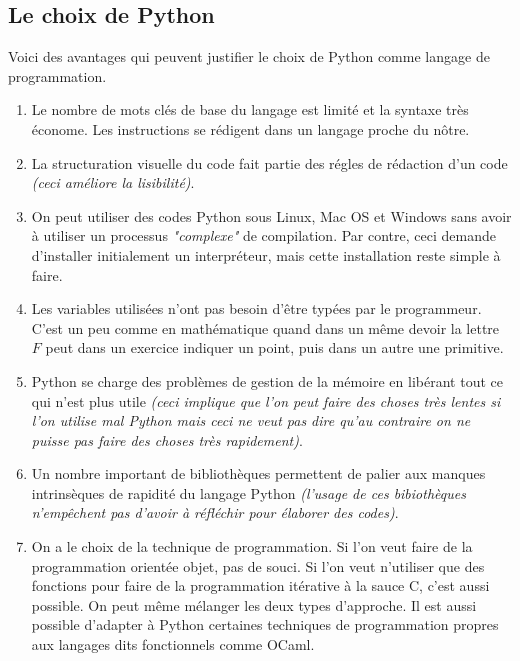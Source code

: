\subsection{Le choix de Python}

Voici des avantages qui peuvent justifier le choix de Python comme langage de programmation.

\begin{enumerate}
\item Le nombre de mots clés de base du langage est limité et la syntaxe très économe. Les instructions se rédigent dans un langage proche du nôtre.

\item La structuration visuelle du code fait partie des régles de rédaction d'un code \textit{\textit{(ceci améliore la lisibilité)}}.

\item On peut utiliser des codes Python sous Linux, Mac OS et Windows sans avoir à utiliser un processus \textit{"complexe"} de compilation. Par contre, ceci demande d'installer initialement un interpréteur, mais cette installation reste simple à faire.

\item Les variables utilisées n'ont pas besoin d'être typées par le programmeur. C'est un peu comme en mathématique quand dans un même devoir la lettre $F$ peut dans un exercice indiquer un point, puis dans un autre une primitive.

\item Python se charge des problèmes de gestion de la mémoire en libérant tout ce qui n'est plus utile \textit{\textit{(ceci implique que l'on peut faire des choses très lentes si l'on utilise mal Python mais ceci ne veut pas dire qu'au contraire on ne puisse pas faire des choses très rapidement)}}.

\item Un nombre important de bibliothèques permettent de palier aux manques intrinsèques de rapidité du langage Python \textit{\textit{(l'usage de ces bibiothèques n'empêchent pas d'avoir à réfléchir pour élaborer des codes)}}.

\item On a le choix de la technique de programmation. Si l'on veut faire de la programmation orientée objet, pas de souci. Si l'on veut n'utiliser que des fonctions pour faire de la programmation itérative à la sauce C, c'est aussi possible. On peut même mélanger les deux types d'approche. Il est aussi possible d'adapter à Python certaines techniques de programmation propres aux langages dits fonctionnels comme OCaml.
\end{enumerate}